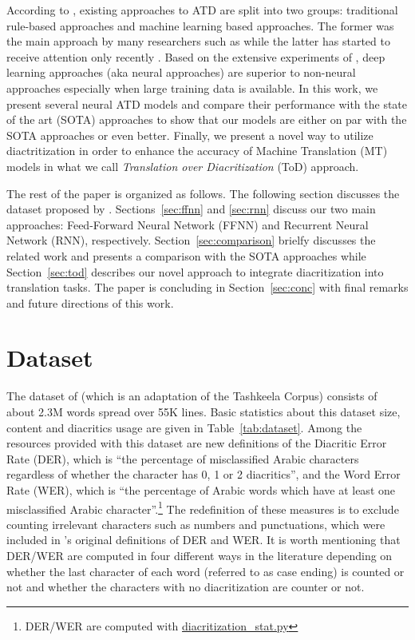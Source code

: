 \documentclass[11pt,a4paper]{article}
\begin{document}
According to \cite{dataset}, existing approaches to ATD are split into two groups: traditional rule-based approaches and machine learning based approaches. The former was the main approach by many researchers such as \cite{zitouni2009arabic,pasha2014madamira,darwish2017arabic} while the latter has started to receive attention only recently \cite{belinkov2015arabic,abandah2015automatic,shakkala,mubarak2019highly}. Based on the extensive experiments of \cite{dataset}, deep learning approaches (aka neural approaches) are superior to non-neural approaches especially when large training data is available. In this work, we present several neural ATD models and compare their performance with the state of the art (SOTA) approaches to show that our models are either on par with the SOTA approaches or even better.
Finally, we present a novel way to utilize diactritization in order to enhance the accuracy of Machine Translation (MT) models in what we call \emph{Translation over Diacritization} (ToD) approach.

The rest of the paper is organized as follows. The following section discusses the dataset proposed by \cite{dataset}.
Sections~\ref{sec:ffnn} and \ref{sec:rnn} discuss our two main approaches: Feed-Forward Neural Network (FFNN) and Recurrent Neural Network (RNN), respectively. Section~\ref{sec:comparison} brielfy discusses the related work and presents a comparison with the SOTA approaches while Section~\ref{sec:tod} describes our novel approach to integrate diacritization into translation tasks. The paper is concluding in Section~\ref{sec:conc} with final remarks and future directions of this work.

\section{Dataset}
\label{sec:dataset}

The dataset of \cite{dataset} (which is an adaptation of the Tashkeela Corpus) consists of about 2.3M words spread over 55K lines. Basic statistics about this dataset size, content and diacritics usage are given in Table~\ref{tab:dataset}.
Among the resources provided with this dataset are new definitions of the 
Diacritic Error Rate (DER), which is ``the percentage of misclassified Arabic characters regardless of whether the character has 0, 1 or 2 diacritics'', and the Word Error Rate (WER), which is ``the percentage of Arabic words which have at least one misclassified Arabic character''.\footnote{DER/WER are computed with \href{https://github.com/AliOsm/arabic-text-diacritization/blob/master/helpers/diacritization_stat.py}{diacritization\_stat.py}}
The redefinition of these measures is to exclude counting irrelevant characters such as numbers and punctuations, which were included in \cite{zitouni2009arabic}'s original definitions of DER and WER.
It is worth mentioning that DER/WER are computed in four different ways in the literature depending on whether the last character of each word (referred to as case ending) is counted or not and whether the characters with no diacritization are counter or not.
\end{document}
